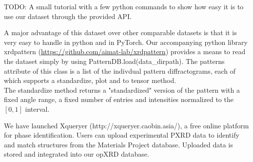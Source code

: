 TODO: A small tutorial with a few python commands to show how easy it is to use our dataset through the provided API.

A major advantage of this dataset over other comparable datasets is that it is very easy to handle in python and in PyTorch.
Our accompanying python library xrdpattern (\url{https://github.com/aimat-lab/xrdpattern}) provides a means to read the dataset simply by using PatternDB.load(data\_dirpath). The patterns attribute of this class is a list of the indivdual pattern diffractograms, each of which supports a standardize, plot and to tensor method. \\
The standardize method returns a "standardized" version of the pattern with a fixed angle range, a fixed number of entries and intensities normalized to the $[0,1]$ interval.

We have launched Xqueryer (http://xqueryer.caobin.asia/), a free online platform for phase identification. Users can upload experimental PXRD data to identify and match structures from the Materials Project database. Uploaded data is stored and integrated into our opXRD database.